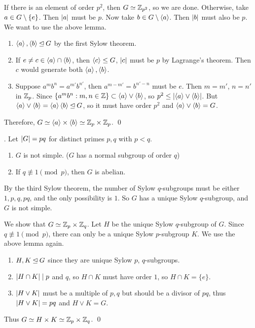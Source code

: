 \pf If there is an element of order \(p^2\), then \(G \simeq \mathbb{Z}_{p^2}\), so we are done. Otherwise, take \(a \in G \setminus \{e\}\). Then \(\left| a \right|\) must be \(p\). Now take \(b \in G \setminus \left\langle a \right\rangle\). Then \(\left| b \right|\) must also be \(p\). We want to use the above lemma.
\begin{enumerate}
    \item \(\left\langle a \right\rangle, \left\langle b \right\rangle \unlhd G\) by the first Sylow theorem.
    \item If \(e \neq c \in \left\langle a \right\rangle \cap \left\langle b \right\rangle\), then \(\left\langle c \right\rangle \leq G\), \(\left| c \right|\) must be \(p\) by Lagrange's theorem. Then \(c\) would generate both \(\left\langle a \right\rangle, \left\langle b \right\rangle\).
    \item Suppose \(a^mb^n = a^{m'}b^{n'}\), then \(a^{m-m'} = b^{n'-n}\) must be \(e\). Then \(m = m'\), \(n = n'\) in \(\mathbb{Z}_p\). Since \(\{a^mb^n : m, n \in \mathbb{Z}\} \subset \left\langle a \right\rangle \vee \left\langle b \right\rangle\), so \(p^2 \leq \left| \left\langle a \right\rangle \vee \left\langle b \right\rangle \right|\). But \(\left\langle a \right\rangle \vee \left\langle b \right\rangle = \left\langle a \right\rangle\left\langle b \right\rangle \unlhd G\), so it must have order \(p^2\) and \(\left\langle a \right\rangle \vee \left\langle b \right\rangle = G\).
\end{enumerate}
Therefore, \(G \simeq \left\langle a \right\rangle \times \left\langle b \right\rangle \simeq \mathbb{Z}_p \times \mathbb{Z}_p\). \qed

\thm. Let \(\left| G \right| = pq\) for distinct primes \(p, q\) with \(p < q\).
\begin{enumerate}
    \item \(G\) is not simple. (\(G\) has a normal subgroup of order \(q\))
    \item If \(q \not\equiv 1 \pmod p\), then \(G\) is abelian.
\end{enumerate}

\pf {} By the third Sylow theorem, the number of Sylow \(q\)-subgroups must be either \(1, p, q, pq\), and the only possibility is \(1\). So \(G\) has a unique Sylow \(q\)-subgroup, and \(G\) is not simple.

 We show that \(G \simeq \mathbb{Z}_p \times \mathbb{Z}_q\). Let \(H\) be the unique Sylow \(q\)-subgroup of \(G\). Since \(q \not\equiv 1 \pmod p\), there can only be a unique Sylow \(p\)-subgroup \(K\). We use the above lemma again.
\begin{enumerate}
    \item \(H, K \unlhd G\) since they are unique Sylow \(p\), \(q\)-subgroups.
    \item \(\left| H \cap K \right| \mid p\) and \(q\), so \(H \cap K\) must have order \(1\), so \(H \cap K = \{e\}\).
    \item \(\left| H \vee K \right|\) must be a multiple of \(p, q\) but should be a divisor of \(pq\), thus \(\left| H \vee K \right| = pq\) and \(H \vee K = G\).
\end{enumerate}
Thus \(G \simeq H \times K \simeq \mathbb{Z}_p \times \mathbb{Z}_q\). \qed

